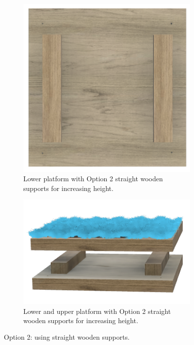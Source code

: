 {\begin{figure}[htb]
  \begin{subfigure}{.45\textwidth}
    \centering
    \includegraphics[width=\textwidth]{img/parkour/option2_lower}
    \caption{Lower platform with Option 2 straight wooden supports for increasing
             height.}
    \label{fig:parkour-option2-lower}
  \end{subfigure}
  \hfill
  \begin{subfigure}{.45\textwidth}
    \centering
    \includegraphics[width=\textwidth]{img/parkour/option2_full}
    \caption{Lower and upper platform with Option 2 straight wooden supports
             for increasing height.}
    \label{fig:parkour-option2-full}
  \end{subfigure}
  \caption{Option 2: using straight wooden supports.}
\end{figure}

}
